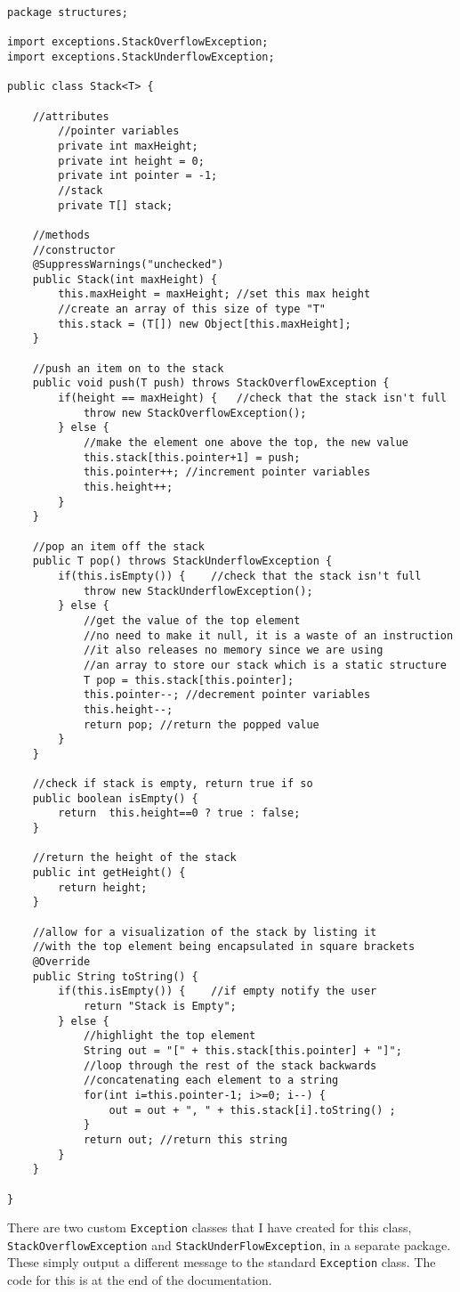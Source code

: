\documentclass[../../../../../main.tex]{subfiles}
\begin{document}
\begin{verbatim}
package structures;

import exceptions.StackOverflowException;
import exceptions.StackUnderflowException;

public class Stack<T> {
	
	//attributes
		//pointer variables
		private int maxHeight;
		private int height = 0;
		private int pointer = -1;
		//stack
		private T[] stack;
	
	//methods
	//constructor
	@SuppressWarnings("unchecked")
	public Stack(int maxHeight) {
		this.maxHeight = maxHeight;	//set this max height
		//create an array of this size of type "T"
		this.stack = (T[]) new Object[this.maxHeight];		
	}
	
	//push an item on to the stack
	public void push(T push) throws StackOverflowException {
		if(height == maxHeight) {	//check that the stack isn't full
			throw new StackOverflowException();
		} else {
			//make the element one above the top, the new value
			this.stack[this.pointer+1] = push; 
			this.pointer++;	//increment pointer variables
			this.height++;
		}
	}
	
	//pop an item off the stack
	public T pop() throws StackUnderflowException {
		if(this.isEmpty()) {	//check that the stack isn't full
			throw new StackUnderflowException();
		} else {
			//get the value of the top element
			//no need to make it null, it is a waste of an instruction
			//it also releases no memory since we are using
			//an array to store our stack which is a static structure
			T pop = this.stack[this.pointer];
			this.pointer--; //decrement pointer variables
			this.height--;
			return pop;	//return the popped value
		}
	}
	
	//check if stack is empty, return true if so
	public boolean isEmpty() {
		return  this.height==0 ? true : false;
	}
	
	//return the height of the stack
	public int getHeight() {
		return height;
	}

	//allow for a visualization of the stack by listing it
	//with the top element being encapsulated in square brackets
	@Override
	public String toString() {
		if(this.isEmpty()) {	//if empty notify the user
			return "Stack is Empty";
		} else {
			//highlight the top element
			String out = "[" + this.stack[this.pointer] + "]";
			//loop through the rest of the stack backwards
			//concatenating each element to a string
			for(int i=this.pointer-1; i>=0; i--) {
				out = out + ", " + this.stack[i].toString() ;
			}
			return out;	//return this string
		}
	}
	
}
\end{verbatim}
There are two custom \texttt{Exception} classes that I have created for this class, \texttt{StackOverflowException} and \texttt{StackUnderFlowException}, in a separate package. These simply output a different message to the standard \texttt{Exception} class. The code for this is at the end of the documentation.

\newpage
\end{document}
